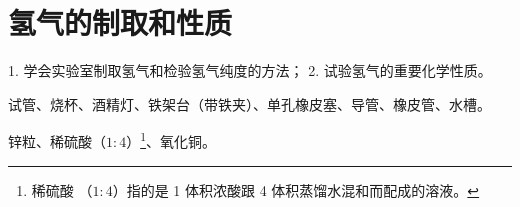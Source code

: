 \section{氢气的制取和性质}\label{sec:xssy-sy4}

\begin{shiyanmudi}
    1. 学会实验室制取氢气和检验氢气纯度的方法； 2. 试验氢气的重要化学性质。
\end{shiyanmudi}


\begin{shiyanyongpin}
    试管、烧杯、酒精灯、铁架台（带铁夹）、单孔橡皮塞、导管、橡皮管、水槽。

    锌粒、稀硫酸（$1:4$）\footnote{稀硫酸 （$1:4$）指的是 1 体积浓酸跟 4 体积蒸馏水混和而配成的溶液。}、氧化铜。
\end{shiyanyongpin}


